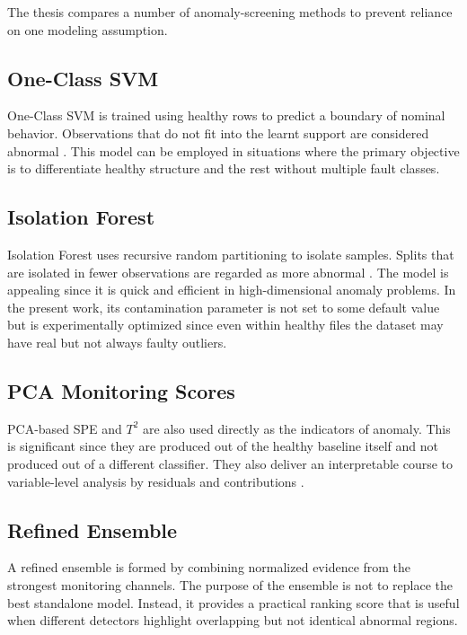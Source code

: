 \documentclass[12pt,a4paper]{report}
\begin{document}
	The thesis compares a number of anomaly-screening methods to prevent reliance on one modeling assumption.
	
	\subsection{One-Class SVM}
	
	One-Class SVM is trained using healthy rows to predict a boundary of nominal behavior. Observations that do not fit into the learnt support are considered abnormal \cite{scholkopf2001ocsvm}. This model can be employed in situations where the primary objective is to differentiate healthy structure and the rest without multiple fault classes.
	
	\subsection{Isolation Forest}
	
	Isolation Forest uses recursive random partitioning to isolate samples. Splits that are isolated in fewer observations are regarded as more abnormal \cite{liu2008iforest,liu2012iforest}. The model is appealing since it is quick and efficient in high-dimensional anomaly problems. In the present work, its contamination parameter is not set to some default value but is experimentally optimized since even within healthy files the dataset may have real but not always faulty outliers.
	
	\subsection{PCA Monitoring Scores}
	
	PCA-based SPE and $T^2$ are also used directly as the indicators of anomaly. This is significant since they are produced out of the healthy baseline itself and not produced out of a different classifier. They also deliver an interpretable course to variable-level analysis by residuals and contributions \cite{westerhuis2000contrib}.
	
	\subsection{Refined Ensemble}
	
	A refined ensemble is formed by combining normalized evidence from the strongest monitoring channels. The purpose of the ensemble is not to replace the best standalone model. Instead, it provides a practical ranking score that is useful when different detectors highlight overlapping but not identical abnormal regions.
	
\end{document}
